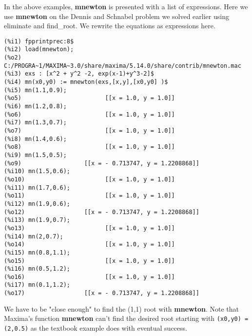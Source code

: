 \documentclass[12pt]{article}
\begin{document}
In the above examples, \textbf{mnewton} is presented with a list of expressions.
Here we use \textbf{mnewton} on the Dennis and Schnabel problem we solved earlier
 using eliminate and find\_root. 
We rewrite the equations as expressions here.

\small
\begin{verbatim}
(%i1) fpprintprec:8$
(%i2) load(mnewton);
(%o2) C:/PROGRA~1/MAXIMA~3.0/share/maxima/5.14.0/share/contrib/mnewton.mac
(%i3) exs : [x^2 + y^2 -2, exp(x-1)+y^3-2]$
(%i4) mn(x0,y0) := mnewton(exs,[x,y],[x0,y0] )$
(%i5) mn(1.1,0.9);
(%o5)                        [[x = 1.0, y = 1.0]]
(%i6) mn(1.2,0.8);
(%o6)                        [[x = 1.0, y = 1.0]]
(%i7) mn(1.3,0.7);
(%o7)                        [[x = 1.0, y = 1.0]]
(%i8) mn(1.4,0.6);
(%o8)                        [[x = 1.0, y = 1.0]]
(%i9) mn(1.5,0.5);
(%o9)                  [[x = - 0.713747, y = 1.2208868]]
(%i10) mn(1.5,0.6);
(%o10)                       [[x = 1.0, y = 1.0]]
(%i11) mn(1.7,0.6);
(%o11)                       [[x = 1.0, y = 1.0]]
(%i12) mn(1.9,0.6);
(%o12)                 [[x = - 0.713747, y = 1.2208868]]
(%i13) mn(1.9,0.7);
(%o13)                       [[x = 1.0, y = 1.0]]
(%i14) mn(2,0.7);
(%o14)                       [[x = 1.0, y = 1.0]]
(%i15) mn(0.8,1.1);
(%o15)                       [[x = 1.0, y = 1.0]]
(%i16) mn(0.5,1.2);
(%o16)                       [[x = 1.0, y = 1.0]]
(%i17) mn(0.1,1.2);
(%o17)                 [[x = - 0.713747, y = 1.2208868]]
\end{verbatim}
\normalsize
We have to be "close enough" to find the (1,1) root with \textbf{mnewton}.
Note that Maxima's function \textbf{mnewton} can't find the desired root starting
 with \verb|(x0,y0) = (2,0.5)| as the textbook example does with eventual success.\\
\end{document}
